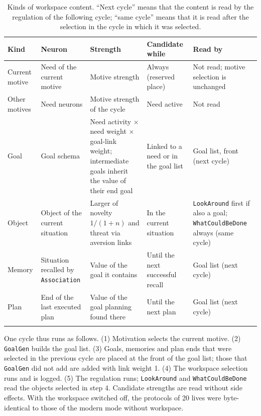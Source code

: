 \documentclass[11pt,a4paper]{article}
\newcommand{\code}[1]{\texttt{#1}}
\begin{document}
\begin{table}[t]
\centering
\caption{Kinds of workspace content. ``Next cycle'' means that the content is read by the regulation of the following cycle; ``same cycle'' means that it is read after the selection in the cycle in which it was selected.}
\label{tab:kinds}
\footnotesize
\begin{tabularx}{\textwidth}{L{0.12\textwidth} L{0.17\textwidth} L{0.27\textwidth} L{0.15\textwidth} Y}
\toprule
Kind & Neuron & Strength & Candidate while & Read by \\
\midrule
Current motive & Need of the current motive & Motive strength & Always (reserved place) & Not read; motive selection is unchanged \\ \addlinespace
Other motives & Need neurons & Motive strength of the cycle & Need active & Not read \\ \addlinespace
Goal & Goal schema & Need activity $\times$ need weight $\times$ goal-link weight; intermediate goals inherit the value of their end goal & Linked to a need or in the goal list & Goal list, front (next cycle) \\ \addlinespace
Object & Object of the current situation & Larger of novelty $1/(1+n)$ and threat via aversion links & In the current situation & \code{LookAround} first if also a goal; \code{WhatCouldBeDone} always (same cycle) \\ \addlinespace
Memory & Situation recalled by \code{Association} & Value of the goal it contains & Until the next successful recall & Goal list (next cycle) \\ \addlinespace
Plan & End of the last executed plan & Value of the goal planning found there & Until the next plan & Goal list (next cycle) \\ \addlinespace
\bottomrule
\end{tabularx}
\end{table}

One cycle thus runs as follows. (1) Motivation selects the current motive. (2) \code{GoalGen} builds the goal list. (3) Goals, memories and plan ends that were selected in the previous cycle are placed at the front of the goal list; those that \code{GoalGen} did not add are added with link weight 1. (4) The workspace selection runs and is logged. (5) The regulation runs; \code{LookAround} and \code{WhatCouldBeDone} read the objects selected in step 4. Candidate strengths are read without side effects. With the workspace switched off, the protocols of 20 lives were byte-identical to those of the modern mode without workspace.
\end{document}
